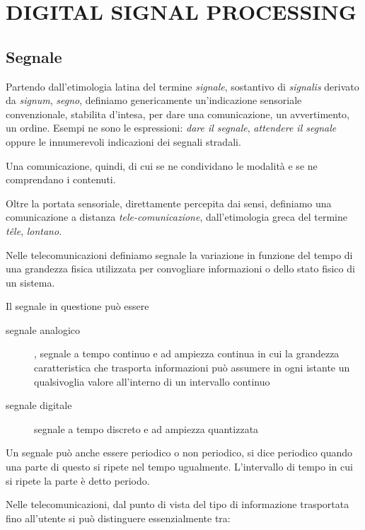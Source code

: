 
\chapter{DIGITAL SIGNAL PROCESSING}

\section{Segnale}

Partendo dall'etimologia latina del termine \emph{signale}, sostantivo di
\emph{signalis} derivato da \emph{signum}, \emph{segno}, definiamo genericamente
un'indicazione sensoriale convenzionale, stabilita d'intesa, per dare una
comunicazione, un avvertimento, un ordine. Esempi ne sono le espressioni:
\emph{dare il segnale}, \emph{attendere il segnale} oppure le innumerevoli
indicazioni dei segnali stradali.

Una comunicazione, quindi, di cui se ne condividano le modalità e se ne
comprendano i contenuti.

Oltre la portata sensoriale, direttamente percepita dai sensi, definiamo
una comunicazione a distanza \emph{tele-comunicazione}, dall'etimologia greca
del termine \emph{têle}, \emph{lontano}.

Nelle telecomunicazioni definiamo segnale la variazione in funzione del tempo
di una grandezza fisica utilizzata per convogliare informazioni o dello stato
fisico di un sistema.

Il segnale in questione può essere

\begin{description}
  \item[segnale analogico], segnale a tempo continuo e ad ampiezza continua in
       cui la grandezza caratteristica che trasporta
       informazioni può assumere in ogni istante un qualsivoglia valore
       all'interno di un intervallo continuo
  \item[segnale digitale] segnale a tempo discreto e ad ampiezza quantizzata
\end{description}

Un segnale può anche essere periodico o non periodico, si dice periodico quando
una parte di questo si ripete nel tempo ugualmente. L'intervallo di tempo in cui
si ripete la parte è detto periodo.

Nelle telecomunicazioni, dal punto di vista del tipo di informazione trasportata
fino all'utente si può distinguere essenzialmente tra:

